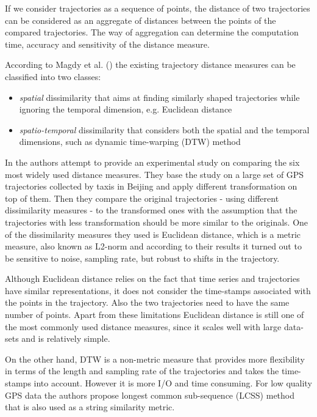 If we consider trajectories as a sequence of points, the distance of two trajectories can be considered as an aggregate of distances between the points of the compared trajectories. The way of aggregation can determine the computation time, accuracy and sensitivity of the distance measure.

According to Magdy et al. (\cite{traj-sim-rev}) the existing trajectory distance measures can be classified into two classes: 
\begin{itemize}
    \item \textit{spatial} dissimilarity that aims at finding similarly  shaped trajectories while ignoring the temporal dimension, e.g. Euclidean distance
    \item \textit{spatio-temporal} dissimilarity that considers both the spatial and the temporal dimensions, such as dynamic time-warping (DTW) method
\end{itemize}

In \cite{traj-sim} the authors attempt to provide an experimental study on comparing the six most widely used distance measures. They base the study on a large set of GPS trajectories collected by taxis in Beijing and apply different transformation on top of them. Then they compare the original trajectories - using different dissimilarity measures - to the transformed ones with the assumption that the trajectories with less transformation should be more similar to the originals. One of the dissimilarity measures they used is Euclidean distance, which is a metric measure, also known as L2-norm and according to their results it turned out to be sensitive to noise, sampling rate, but robust to shifts in the trajectory.

Although Euclidean distance relies on the fact that time series and trajectories have similar representations, it does not consider the time-stamps associated with the points in the trajectory. Also the two trajectories need to have the same number of points. Apart from these limitations Euclidean distance is still one of the most commonly used distance measures, since it scales well with large data-sets and is relatively simple. 

On the other hand, DTW is a non-metric measure that provides more flexibility in terms of the length and sampling rate of the trajectories and takes the time-stamps into account. However it is more I/O and time consuming. For low quality GPS data the authors propose longest common sub-sequence (LCSS) method that is also used as a string similarity metric.

